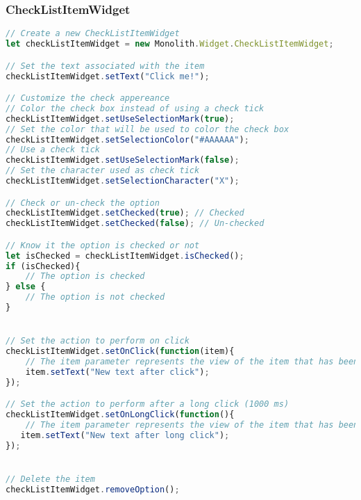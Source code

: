\subsubsection{CheckListItemWidget}
\begin{lstlisting}[language=JavaScript]
// Create a new CheckListItemWidget
let checkListItemWidget = new Monolith.Widget.CheckListItemWidget;

// Set the text associated with the item
checkListItemWidget.setText("Click me!");

// Customize the check appereance
// Color the check box instead of using a check tick
checkListItemWidget.setUseSelectionMark(true); 
// Set the color that will be used to color the check box
checkListItemWidget.setSelectionColor("#AAAAAA"); 
// Use a check tick
checkListItemWidget.setUseSelectionMark(false); 
// Set the character used as check tick
checkListItemWidget.setSelectionCharacter("X"); 

// Check or un-check the option
checkListItemWidget.setChecked(true); // Checked
checkListItemWidget.setChecked(false); // Un-checked

// Know it the option is checked or not
let isChecked = checkListItemWidget.isChecked();
if (isChecked){
    // The option is checked
} else {
    // The option is not checked
}


// Set the action to perform on click
checkListItemWidget.setOnClick(function(item){
    // The item parameter represents the view of the item that has been clicked
    item.setText("New text after click");
});

// Set the action to perform after a long click (1000 ms)
checkListItemWidget.setOnLongClick(function(){
    // The item parameter represents the view of the item that has been clicked
   item.setText("New text after long click");
});


// Delete the item
checkListItemWidget.removeOption();
\end{lstlisting}

\newpage
